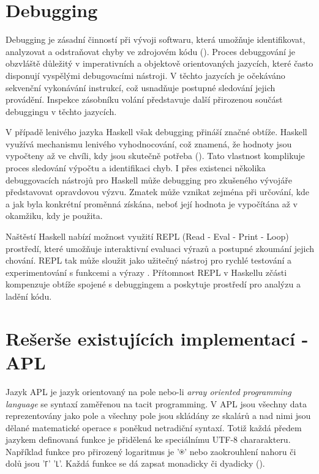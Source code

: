 \documentclass[male,czech]{kithesis}
\begin{document}
\section{Debugging}

Debugging je zásadní činností při vývoji softwaru, 
která umožňuje identifikovat, 
analyzovat a odstraňovat chyby ve zdrojovém kódu (\cite{WhatIsDebugging}). 
Proces debuggování je obzvláště důležitý v imperativních a objektově orientovaných jazycích, 
které často disponují vyspělými debugovacími nástroji.
V těchto jazycích je očekáváno sekvenční vykonávání instrukcí, 
což usnadňuje postupné sledování jejich provádění. 
Inspekce zásobníku volání představuje 
další přirozenou součást debuggingu v těchto jazycích.

V případě lenivého jazyka Haskell však debugging přináší značné obtíže. 
Haskell využívá mechanismu lenivého vyhodnocování, což znamená, 
že hodnoty jsou vypočteny až ve chvíli, kdy jsou skutečně potřeba (\cite{HaskellDebugging}).
Tato vlastnost komplikuje proces sledování výpočtu a identifikaci chyb. 
I přes existenci několika debuggovacích nástrojů pro Haskell může 
debugging pro zkušeného vývojáře představovat opravdovou výzvu. 
Zmatek může vznikat zejména při určování, 
kde a jak byla konkrétní proměnná získána, 
neboť její hodnota je vypočítána až v okamžiku, 
kdy je použita.

Naštěstí Haskell nabízí možnost využití REPL 
(Read - Eval - Print - Loop) prostředí, 
které umožňuje interaktivní evaluaci výrazů a postupné zkoumání jejich chování. 
REPL tak může sloužit jako užitečný nástroj pro rychlé testování 
a experimentování s funkcemi a výrazy \cite{HaskellGHCI}. 
Přítomnost REPL v Haskellu zčásti kompenzuje obtíže spojené 
s debuggingem a poskytuje prostředí pro analýzu a ladění kódu.

\section{Rešerše existujících implementací - APL}

Jazyk APL je jazyk orientovaný na pole nebo-li \textit{array oriented programming language} se 
syntaxí zaměřenou na tacit programming. V APL jsou všechny data reprezentovány jako pole 
a všechny pole jsou skládány ze skalárů a nad 
nimi jsou dělané matematické operace s poněkud netradiční syntaxí. Totiž každá 
předem jazykem definovaná funkce je přidělená ke speciálnímu UTF-8 chararakteru. 
Například funkce pro přirozený logaritmus je {\apl '⍟'} nebo zaokrouhlení nahoru či dolů 
jsou {\apl '⌈' '⌊'}.
Každá funkce se dá zapsat monadicky či dyadicky (\cite{WhyAPLIsWorthKnowing}).
\end{document}

